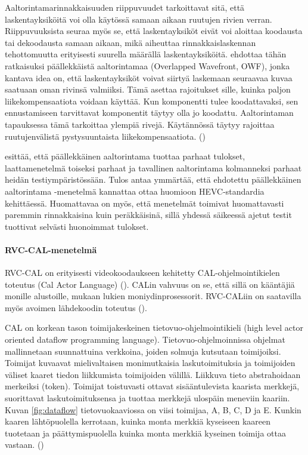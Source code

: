 Aaltorintamarinnakkaisuuden riippuvuudet tarkoittavat sitä, että
laskentayksiköitä voi olla käytössä samaan aikaan ruutujen rivien verran.
Riippuvuuksista seuraa myös se, että laskentayksiköt eivät voi aloittaa
koodausta tai dekoodausta samaan aikaan, mikä aiheuttaa rinnakkaislaskennan
tehottomuutta erityisesti suurella määrällä laskentayksiköitä.
\citealt{chi} ehdottaa tähän ratkaisuksi päällekkäistä
aaltorintamaa (Overlapped Wavefront, OWF), jonka kantava idea on, että
laskentayksiköt voivat siirtyä laskemaan seuraavaa kuvaa saatuaan oman rivinsä
valmiiksi. Tämä asettaa rajoitukset sille, kuinka paljon liikekompensaatiota
voidaan käyttää. Kun komponentti tulee koodattavaksi, sen ennustamiseen
tarvittavat komponentit täytyy olla jo koodattu. Aaltorintaman tapauksessa
tämä tarkoittaa ylempiä rivejä. Käytännössä täytyy rajoittaa ruutujenvälistä
pystysuuntaista liikekompensaatiota. (\citealt{chi})

\citealt{chi} esittää, että päällekkäinen aaltorintama tuottaa parhaat tulokset,
laattamenetelmä toiseksi parhaat ja tavallinen aaltorintama kolmanneksi parhaat
heidän testiympäristössään. Tulos antaa ymmärtää, että ehdotettu päällekkäinen
aaltorintama -menetelmä kannattaa ottaa huomioon HEVC-standardia kehittäessä.
Huomattavaa on myös, että menetelmät toimivat huomattavasti paremmin
rinnakkaisina kuin peräkkäisinä, sillä yhdessä säikeessä ajetut testit
tuottivat selvästi huonoimmat tulokset.

\paragraph{RVC-CAL-menetelmä}
RVC-CAL on erityisesti videokoodaukseen kehitetty
CAL-ohjelmointikielen toteutus (Cal Actor Language) (\citealt{rvc}). CALin vahvuus on se, että
sillä on kääntäjiä monille alustoille, mukaan lukien moniydinprosessorit.
RVC-CALiin on saatavilla myös avoimen lähdekoodin toteutus (\citealt{orcc}).

CAL on korkean tason toimijakeskeinen tietovuo-ohjelmointikieli (high level
actor oriented dataflow programming language). Tietovuo-ohjelmoinnissa ohjelmat
mallinnetaan suunnattuina verkkoina, joiden solmuja kutsutaan toimijoiksi.
Toimijat kuvaavat mielivaltaisen monimutkaisia laskutoimituksia ja toimijoiden
väliset kaaret tiedon liikkumista toimijoiden välillä. Liikkuva tieto
abstrahoidaan merkeiksi (token). Toimijat toistuvasti ottavat sisääntulevista kaarista
merkkejä, suorittavat laskutoimituksensa ja tuottaa merkkejä ulospäin
meneviin kaariin. Kuvan \ref{fig:dataflow} tietovuokaaviossa on viisi toimijaa,
A, B, C, D ja E. Kunkin kaaren lähtöpuolella kerrotaan, kuinka monta merkkiä
kyseiseen kaareen tuotetaan ja päättymispuolella kuinka monta merkkiä kyseinen
toimija ottaa vastaan. (\citealt{rvc})

